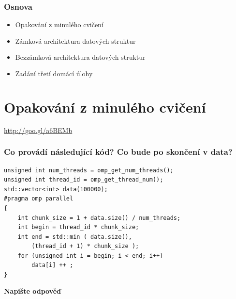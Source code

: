 \documentclass[usenames,dvipsnames,9pt]{beamer}
\begin{document}
\begin{frame}
  \frametitle{Osnova}
  \begin{itemize}
    \item Opakování z minulého cvičení
    \item Zámková architektura datových struktur
    \item Bezzámková architektura datových struktur\\[1.5em]
    \item Zadání třetí domácí úlohy
  \end{itemize}
\end{frame}

\section{Opakování z minulého cvičení}
\begin{frame}[standout]
  \Huge
  \url{http://goo.gl/a6BEMb}
\end{frame}


\begin{frame}[fragile]
  \frametitle{Co provádí následující kód? Co bude po skončení v data?}

\begin{verbatim}
unsigned int num_threads = omp_get_num_threads();
unsigned int thread_id = omp_get_thread_num();
std::vector<int> data(100000);
#pragma omp parallel
{
	int chunk_size = 1 + data.size() / num_threads;
	int begin = thread_id * chunk_size;
	int end = std::min ( data.size(), 
		(thread_id + 1) * chunk_size );
	for (unsigned int i = begin; i < end; i++)
		data[i] ++ ;
}
\end{verbatim}
  
\vspace{2em}
  
  {\bf Napište odpověď}

\end{frame}
\end{document}
